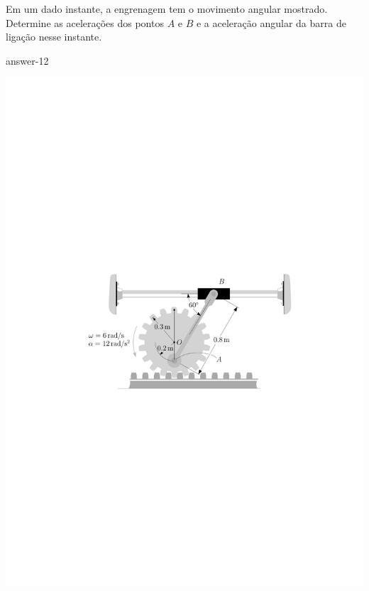 \item Em um dado instante, a engrenagem tem o movimento angular mostrado. Determine as acelerações
dos pontos $A$ e $B$ e a aceleração angular da barra de ligação nesse instante.

{answer-12}

\begin{flushright}
	\includegraphics[scale=1.2]{images/draw_7}
\end{flushright}
